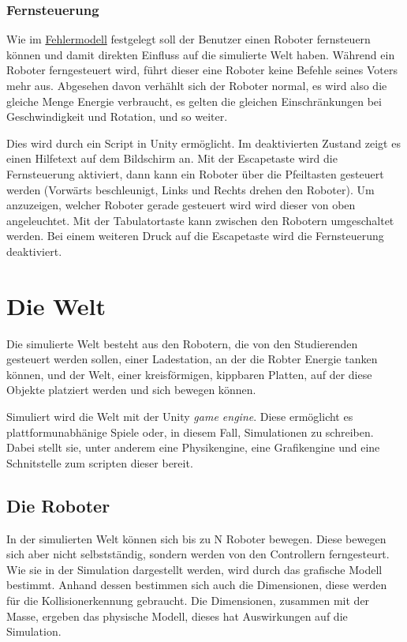 
\subsubsection{Fernsteuerung}
Wie im \hyperref[fm]{Fehlermodell} festgelegt soll der Benutzer einen Roboter fernsteuern k{\"{o}}nnen und damit direkten Einfluss auf die simulierte Welt haben. W{\"{a}}hrend ein Roboter
ferngesteuert wird, f{\"{u}}hrt dieser eine Roboter keine Befehle seines Voters mehr aus. Abgesehen davon verh{\"{a}}hlt sich der Roboter normal, es wird also die gleiche Menge Energie verbraucht,
es gelten die gleichen Einschr{\"{a}}nkungen bei Geschwindigkeit und Rotation, und so weiter.

Dies wird durch ein Script in Unity erm{\"{o}}glicht. Im deaktivierten Zustand zeigt es einen Hilfetext auf dem Bildschirm an. Mit der Escapetaste wird die Fernsteuerung aktiviert, dann kann ein
Roboter {\"{u}}ber die Pfeiltasten gesteuert werden (Vorw{\"{a}}rts beschleunigt, Links und Rechts drehen den Roboter).
Um anzuzeigen, welcher Roboter gerade gesteuert wird wird dieser von oben angeleuchtet. Mit der Tabulatortaste kann zwischen den
Robotern umgeschaltet werden. Bei einem weiteren Druck auf die Escapetaste wird die Fernsteuerung deaktiviert.


\clearpage
\section{Die Welt}
Die simulierte Welt besteht aus den Robotern, die von den Studierenden gesteuert werden sollen, einer Ladestation, an der die Robter Energie tanken k{\"{o}}nnen, und
der Welt, einer kreisf{\"{o}}rmigen, kippbaren Platten, auf der diese Objekte platziert werden und sich bewegen k{\"{o}}nnen.

Simuliert wird die Welt mit der Unity \textit{game engine}. Diese erm{\"{o}}glicht es plattformunabh{\"{a}}nige Spiele oder, in diesem Fall, Simulationen zu schreiben.
Dabei stellt sie, unter anderem eine Physikengine, eine Grafikengine und eine Schnitstelle zum scripten dieser bereit. 

\subsection{Die Roboter}\label{robot}
In der simulierten Welt k{\"{o}}nnen sich bis zu \gls{N} Roboter bewegen. Diese bewegen sich aber nicht selbstst{\"{a}}ndig, sondern werden von den Controllern ferngesteurt.
Wie sie in der Simulation dargestellt werden, wird durch das grafische Modell bestimmt. Anhand dessen bestimmen sich auch die Dimensionen, diese werden f{\"{u}}r die Kollisionerkennung
gebraucht. Die Dimensionen, zusammen mit der Masse, ergeben das physische Modell, dieses hat Auswirkungen auf die Simulation.

